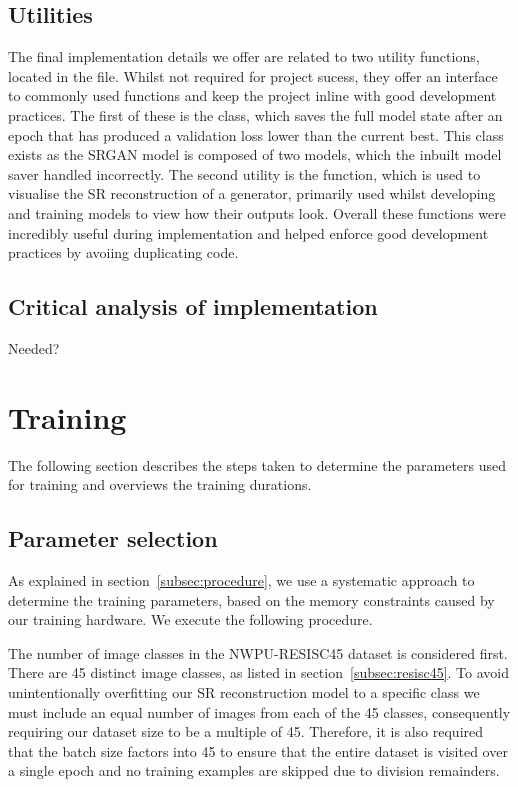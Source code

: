 \subsection{Utilities}
The final implementation details we offer are related to two utility functions, located in the  file. Whilst not required for project sucess, they offer an interface to commonly used functions and keep the project inline with good development practices. The first of these is the  class, which saves the full model state after an epoch that has produced a validation loss lower than the current best. This class exists as the SRGAN model is composed of two models, which the inbuilt  model saver handled incorrectly. The second utility is the  function, which is used to visualise the SR reconstruction of a generator, primarily used whilst developing and training models to view how their outputs look. Overall these functions were incredibly useful during implementation and helped enforce good development practices by avoiing duplicating code.

\subsection{Critical analysis of implementation}
Needed?

\section{Training}
The following section describes the steps taken to determine the parameters used for training and overviews the training durations.

\subsection{Parameter selection}\label{subsec:parameter_selection}
As explained in section~\ref{subsec:procedure}, we use a systematic approach to determine the training parameters, based on the memory constraints caused by our training hardware. We execute the following procedure.

The number of image classes in the NWPU-RESISC45 dataset is considered first. There are 45 distinct image classes, as listed in section~\ref{subsec:resisc45}. To avoid unintentionally overfitting our SR reconstruction model to a specific class we must include an equal number of images from each of the 45 classes, consequently requiring our dataset size to be a multiple of 45. Therefore, it is also required that the batch size factors into 45 to ensure that the entire dataset is visited over a single epoch and no training examples are skipped due to division remainders.

